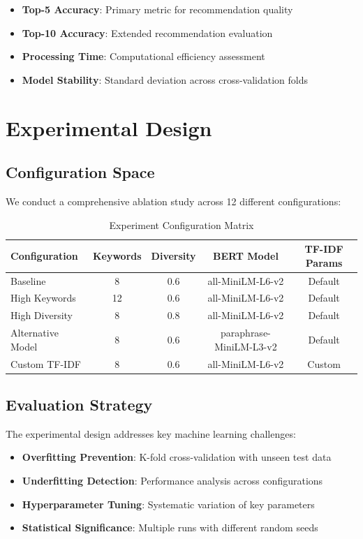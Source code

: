 \documentclass[12pt,a4paper]{article}
\begin{document}
\begin{itemize}
    \item \textbf{Top-5 Accuracy}: Primary metric for recommendation quality
    \item \textbf{Top-10 Accuracy}: Extended recommendation evaluation
    \item \textbf{Processing Time}: Computational efficiency assessment
    \item \textbf{Model Stability}: Standard deviation across cross-validation folds
\end{itemize}

\section{Experimental Design}

\subsection{Configuration Space}
We conduct a comprehensive ablation study across 12 different configurations:

\begin{table}[H]
\centering
\caption{Experiment Configuration Matrix}
\begin{tabular}{|l|c|c|c|c|}
\hline
\textbf{Configuration} & \textbf{Keywords} & \textbf{Diversity} & \textbf{BERT Model} & \textbf{TF-IDF Params} \\
\hline
Baseline & 8 & 0.6 & all-MiniLM-L6-v2 & Default \\
High Keywords & 12 & 0.6 & all-MiniLM-L6-v2 & Default \\
High Diversity & 8 & 0.8 & all-MiniLM-L6-v2 & Default \\
Alternative Model & 8 & 0.6 & paraphrase-MiniLM-L3-v2 & Default \\
Custom TF-IDF & 8 & 0.6 & all-MiniLM-L6-v2 & Custom \\
\hline
\end{tabular}
\end{table}

\subsection{Evaluation Strategy}
The experimental design addresses key machine learning challenges:

\begin{itemize}
    \item \textbf{Overfitting Prevention}: K-fold cross-validation with unseen test data
    \item \textbf{Underfitting Detection}: Performance analysis across configurations
    \item \textbf{Hyperparameter Tuning}: Systematic variation of key parameters
    \item \textbf{Statistical Significance}: Multiple runs with different random seeds
\end{itemize}
\end{document}
